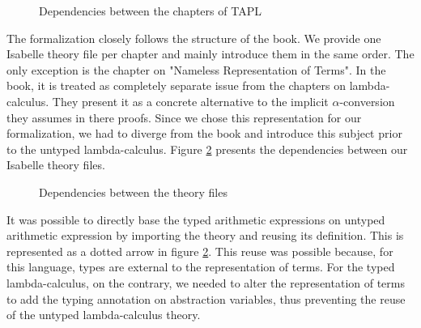 \begin{figure}[h]
  \begin{center}
  \end{center}
  \caption{Dependencies between the chapters of TAPL}
  \label{fig:TAPL-dependencies}
\end{figure}

The formalization closely follows the structure of the book. We provide one Isabelle theory file per
chapter and mainly introduce them in the same order. The only exception is the chapter on "Nameless
Representation of Terms". In the book, it is treated as completely separate issue from the chapters
on lambda-calculus. They present it as a concrete alternative to the implicit $\alpha$-conversion
they assumes in there proofs. Since we chose this representation for our formalization, we had to
diverge from the book and introduce this subject prior to the untyped lambda-calculus. Figure
\ref{fig:thys-dependencies} presents the dependencies between our Isabelle theory files.

\begin{figure}[h]
  \begin{center}
  \end{center}
  \caption{Dependencies between the theory files}
  \label{fig:thys-dependencies}
\end{figure}

It was possible to directly base the typed arithmetic expressions on untyped arithmetic expression
by importing the theory and reusing its definition. This is represented as a dotted arrow in figure
\ref{fig:thys-dependencies}. This reuse was possible because, for this language, types are external
to the representation of terms. For the typed lambda-calculus, on the contrary, we needed to alter
the representation of terms to add the typing annotation on abstraction variables, thus preventing
the reuse of the untyped lambda-calculus theory.
